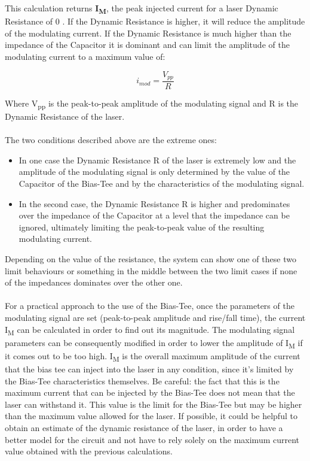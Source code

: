 This calculation returns \textbf{I\textsubscript{M}}, the peak injected current for a laser Dynamic Resistance of 0 \Omega . If the Dynamic Resistance is higher, it will reduce the amplitude of the modulating current. If the Dynamic Resistance is much higher than the impedance of the Capacitor it is dominant and can limit the amplitude of the modulating current to a maximum value of:

\[ i_{mod} = \frac{V_{pp}}{R}\]

Where V\textsubscript{pp} is the peak-to-peak amplitude of the modulating signal and R is the Dynamic Resistance of the laser.

\paragraph{} The two conditions described above are the extreme ones:
\begin{itemize}
    \item In one case the Dynamic Resistance R of the laser is extremely low and the amplitude of the modulating signal is only determined by the value of the Capacitor of the Bias-Tee and by the characteristics of the modulating signal.
    \item In the second case, the Dynamic Resistance R is higher and predominates over the impedance of the Capacitor at a level that the impedance can be ignored, ultimately limiting the peak-to-peak value of the resulting modulating current.
\end{itemize}
Depending on the value of the resistance, the system can show one of these two limit behaviours or something in the middle between the two limit cases if none of the impedances dominates over the other one.

\paragraph{}For a practical approach to the use of the Bias-Tee, once the parameters of the modulating signal are set (peak-to-peak amplitude and rise/fall time), the current I\textsubscript{M} can be calculated in order to find out its magnitude. 
\newline The modulating signal parameters can be consequently modified in order to lower the amplitude of I\textsubscript{M} if it comes out to be too high. I\textsubscript{M} is the overall maximum amplitude of the current that the bias tee can inject into the laser in any condition, since it’s limited by the Bias-Tee characteristics themselves.
\newline Be careful: the fact that this is the maximum current that can be injected by the Bias-Tee does not mean that the laser can withstand it. This value is the limit for the Bias-Tee but may be higher than the maximum value allowed for the laser.
\newline If possible, it could be helpful to obtain an estimate of the dynamic resistance of the laser, in order to have a better model for the circuit and not have to rely solely on the maximum current value obtained with the previous calculations. 

